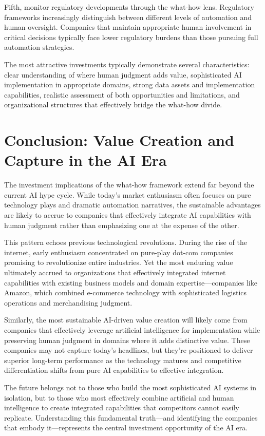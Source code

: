 \documentclass[
  Letterpaper,
]{scrbook}
\begin{document}
Fifth, monitor regulatory developments through the what-how lens.
Regulatory frameworks increasingly distinguish between different levels
of automation and human oversight. Companies that maintain appropriate
human involvement in critical decisions typically face lower regulatory
burdens than those pursuing full automation strategies.

The most attractive investments typically demonstrate several
characteristics: clear understanding of where human judgment adds value,
sophisticated AI implementation in appropriate domains, strong data
assets and implementation capabilities, realistic assessment of both
opportunities and limitations, and organizational structures that
effectively bridge the what-how divide.

\section{Conclusion: Value Creation and Capture in the AI
Era}\label{conclusion-value-creation-and-capture-in-the-ai-era}

The investment implications of the what-how framework extend far beyond
the current AI hype cycle. While today's market enthusiasm often focuses
on pure technology plays and dramatic automation narratives, the
sustainable advantages are likely to accrue to companies that
effectively integrate AI capabilities with human judgment rather than
emphasizing one at the expense of the other.

This pattern echoes previous technological revolutions. During the rise
of the internet, early enthusiasm concentrated on pure-play dot-com
companies promising to revolutionize entire industries. Yet the most
enduring value ultimately accrued to organizations that effectively
integrated internet capabilities with existing business models and
domain expertise---companies like Amazon, which combined e-commerce
technology with sophisticated logistics operations and merchandising
judgment.

Similarly, the most sustainable AI-driven value creation will likely
come from companies that effectively leverage artificial intelligence
for implementation while preserving human judgment in domains where it
adds distinctive value. These companies may not capture today's
headlines, but they're positioned to deliver superior long-term
performance as the technology matures and competitive differentiation
shifts from pure AI capabilities to effective integration.

The future belongs not to those who build the most sophisticated AI
systems in isolation, but to those who most effectively combine
artificial and human intelligence to create integrated capabilities that
competitors cannot easily replicate. Understanding this fundamental
truth---and identifying the companies that embody it---represents the
central investment opportunity of the AI era.
\end{document}
